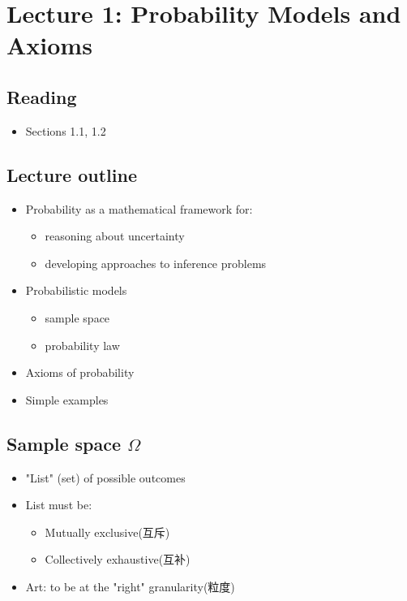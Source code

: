 \section{Lecture 1: Probability Models and Axioms}
    \subsection{Reading}
    \begin{itemize}
        \item Sections 1.1, 1.2
    \end{itemize}

    \subsection{Lecture outline}
    \begin{itemize}
        \item Probability as a mathematical framework for: 
        \begin{itemize}
            \item reasoning about uncertainty
            \item developing approaches to inference problems
        \end{itemize}

        \item Probabilistic models
        \begin{itemize}
            \item sample space
            \item probability law
        \end{itemize}

        \item Axioms of probability
        \item Simple examples
    \end{itemize}

    \subsection{Sample space \texorpdfstring{$\Omega$}{}}
    \begin{itemize}
        \item "List" (set) of possible outcomes
        \item List must be:
        \begin{itemize}
            \item Mutually exclusive(互斥)
            \item Collectively exhaustive(互补)
        \end{itemize}

        \item Art: to be at the "right" granularity(粒度)
    \end{itemize}

